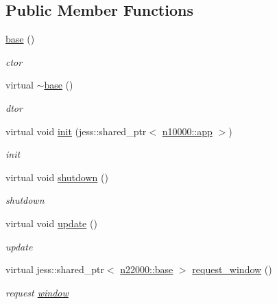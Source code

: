 \subsection*{Public Member Functions}
\begin{DoxyCompactItemize}
\item 
\hyperlink{classnebula_1_1platform_1_1platform_1_1base_ab5473b3326da0afc860eec802b01fcf8}{base} ()
\begin{DoxyCompactList}\small\item\em ctor \item\end{DoxyCompactList}\item 
virtual \hyperlink{classnebula_1_1platform_1_1platform_1_1base_af06e978c1a4676fb040758a35a8c2ea1}{$\sim$base} ()
\begin{DoxyCompactList}\small\item\em dtor \item\end{DoxyCompactList}\item 
virtual void \hyperlink{classnebula_1_1platform_1_1platform_1_1base_a1098d6ac08afd649c5ce01fbaafd3374}{init} (jess::shared\_\-ptr$<$ \hyperlink{classnebula_1_1framework_1_1app}{n10000::app} $>$)
\begin{DoxyCompactList}\small\item\em init \item\end{DoxyCompactList}\item 
virtual void \hyperlink{classnebula_1_1platform_1_1platform_1_1base_ae2dafd0a663fdb8b95211c975c35c79a}{shutdown} ()
\begin{DoxyCompactList}\small\item\em shutdown \item\end{DoxyCompactList}\item 
virtual void \hyperlink{classnebula_1_1platform_1_1platform_1_1base_a9036fffff86ce314d44ab292291088c9}{update} ()
\begin{DoxyCompactList}\small\item\em update \item\end{DoxyCompactList}\item 
virtual jess::shared\_\-ptr$<$ \hyperlink{classnebula_1_1platform_1_1window_1_1base}{n22000::base} $>$ \hyperlink{classnebula_1_1platform_1_1platform_1_1base_ad9dd0043c0e52019ed6e24a2d17b686e}{request\_\-window} ()
\begin{DoxyCompactList}\small\item\em request \hyperlink{namespacenebula_1_1platform_1_1window}{window} \item\end{DoxyCompactList}\item 

\end{DoxyCompactItemize}
